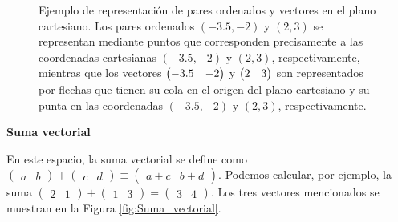 \documentclass[apuntes]{subfiles}
\begin{document}
\begin{figure}[h!]
    \centering
    \caption{Ejemplo de representación de pares ordenados y vectores en el plano cartesiano. Los pares ordenados $(-3.5,-2)$ y $(2,3)$ se representan mediante puntos que corresponden precisamente a las coordenadas cartesianas $(-3.5,-2)$ y $(2,3)$, respectivamente, mientras que los vectores $\protect\begin{pmatrix} -3.5 & -2 \protect\end{pmatrix}$ y $\protect\begin{pmatrix} 2 & 3 \protect\end{pmatrix}$ son representados por flechas que tienen su cola en el origen del plano cartesiano y su punta en las coordenadas $(-3.5,-2)$ y $(2,3)$, respectivamente.} 
    \label{fig:Correspondencias_del_plano_cartesiano}
\end{figure}

\vspace{3mm}
\textbf{Suma vectorial}
\vspace{3mm}

    En este espacio, la suma vectorial se define como $\begin{pmatrix}a&b\end{pmatrix}+\begin{pmatrix}c&d\end{pmatrix}\equiv\begin{pmatrix}a+c&b+d\end{pmatrix}$. Podemos calcular, por ejemplo, la suma $\begin{pmatrix}2&1\end{pmatrix}+\begin{pmatrix}1&3\end{pmatrix}=\begin{pmatrix}3&4\end{pmatrix}$. Los tres vectores mencionados se muestran en la Figura \ref{fig:Suma_vectorial}.
\end{document}
